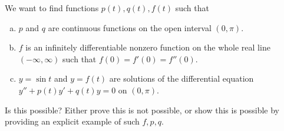 We want to find functions $p(t), q(t), f(t)$ such that

\begin{enumerate}[(a)]
\item $p$ and $q$ are continuous functions on the open interval $(0, \pi)$.
\item $f$ is an infinitely differentiable nonzero function on the whole real
      line $(-\infty, \infty)$ such that $f(0) = f'(0) = f''(0)$.
\item $y = \sin t$ and $y = f(t)$ are solutions of the differential equation
      $y'' + p(t)y' + q(t)y = 0$ on $(0, \pi)$.
\end{enumerate}

Is this possible? Either prove this is not possible, or show this is possible
by providing an explicit example of such $f, p, q$.
